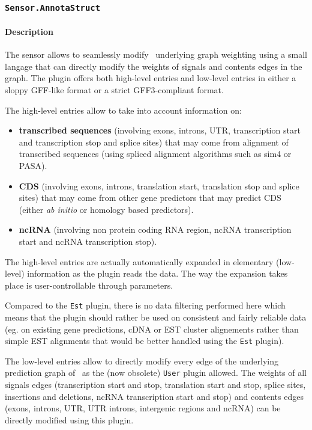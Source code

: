
\subsubsection{\texttt{Sensor.AnnotaStruct}}
\label{annotastruct}
\paragraph{Description}

The sensor allows to seamlessly modify \EuGene\ underlying graph
weighting using a small langage that can directly modify the weights
of signals and contents edges in the graph. The plugin offers both
high-level entries and low-level entries in either a sloppy GFF-like
format or a strict GFF3-compliant format.

The high-level entries allow to take into account information on:
\begin{itemize}
\item \textbf{transcribed sequences} (involving exons, introns, UTR,
  transcription start and transcription stop and splice sites) that
  may come from alignment of transcribed sequences (using spliced
  alignment algorithms such as sim4 or PASA).
\item \textbf{CDS} (involving exons, introns, translation start,
  translation stop and splice sites) that may come from other gene
  predictors that may predict CDS (either \emph{ab initio} or homology based
  predictors).
\item \textbf{ncRNA} (involving non protein coding RNA region, ncRNA transcription start and ncRNA transcription stop).
\end{itemize}
The high-level entries are actually automatically expanded in
elementary (low-level) information as the plugin reads the data. The
way the expansion takes place is user-controllable through parameters.

Compared to the \texttt{Est} plugin, there is no data filtering
performed here which means that the plugin should rather be used on
consistent and fairly reliable data (eg. on existing gene predictions,
cDNA or EST cluster alignements rather than simple EST alignments that
would be better handled using the \texttt{Est} plugin).

The low-level entries allow to directly modify every edge of the
underlying prediction graph of \EuGene\ as the (now obsolete)
\texttt{User} plugin allowed. The weights of all signals edges
(transcription start and stop, translation start and stop, splice
sites, insertions and deletions, ncRNA transcription start and stop) 
and contents edges (exons, introns,
UTR, UTR introns, intergenic regions and ncRNA) can be directly modified
using this plugin.

